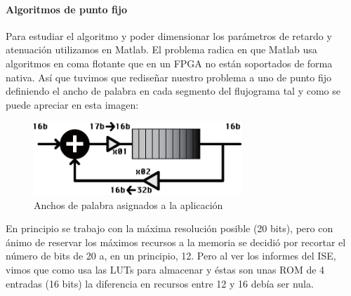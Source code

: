 \paragraph{Algoritmos de punto fijo} Para estudiar el algoritmo y poder dimensionar los parámetros de retardo y atenuación utilizamos en Matlab. El problema radica en que Matlab usa algoritmos en coma flotante que en un FPGA no están soportados de forma nativa. Así que tuvimos que rediseñar nuestro problema a uno de punto fijo definiendo el ancho de palabra en cada segmento del flujograma tal y como se puede apreciar en esta imagen:

\begin{figure}[h]
\begin{center}
	\includegraphics[width=0.7\textwidth]{./reverb_implemented_diagram-eps-converted-to}
\caption{Anchos de palabra asignados a la aplicación}
\label{default}
\end{center}
\end{figure}

	En principio se trabajo con la máxima resolución posible (20 bits), pero con ánimo de reservar los máximos recursos a la memoria se decidió por recortar el número de bits de 20 a, en un principio, 12. Pero al ver los informes del ISE, vimos que como usa las LUTs para almacenar y éstas son unas ROM de 4 entradas (16 bits) la diferencia en recursos entre 12 y 16 debía ser nula.
	
